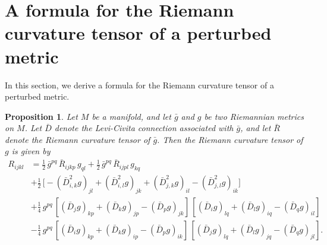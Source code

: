 \documentclass[11pt]{amsart}
\newtheorem{proposition}[theorem]{Proposition}
\theoremstyle{definition}
\begin{document}
\appendix

\section{A formula for the Riemann curvature tensor of a perturbed metric}

\label{curvature.of.perturbed.metric}

In this section, we derive a formula for the Riemann curvature tensor of a perturbed metric.

\begin{proposition}
\label{curvature.tensor.of.perturbed.metric}
Let $M$ be a manifold, and let $\bar{g}$ and $g$ be two Riemannian metrics on $M$. Let $\bar{D}$ denote the Levi-Civita connection associated with $\bar{g}$, and let $\bar{R}$ denote the Riemann curvature tensor of $\bar{g}$. Then the Riemann curvature tensor of $g$ is given by 
\begin{align*} 
R_{ijkl} 
&= \frac{1}{2} \, \bar{g}^{pq} \, \bar{R}_{ijkp} \, g_{ql} + \frac{1}{2} \, \bar{g}^{pq} \, \bar{R}_{ijpl} \, g_{kq} \\ 
&+ \frac{1}{2} \, \big [ -(\bar{D}_{i,k}^2 g)_{jl} + (\bar{D}_{i,l}^2 g)_{jk} + (\bar{D}_{j,k}^2 g)_{il} - (\bar{D}_{j,l}^2 g)_{ik} \big ] \\ 
&+ \frac{1}{4} \, g^{pq} \, [(\bar{D}_j g)_{kp} + (\bar{D}_k g)_{jp} - (\bar{D}_p g)_{jk}] \, [(\bar{D}_i g)_{lq} + (\bar{D}_l g)_{iq} - (\bar{D}_q g)_{il}] \\ 
&- \frac{1}{4} \, g^{pq} \, [(\bar{D}_i g)_{kp} + (\bar{D}_k g)_{ip} - (\bar{D}_p g)_{ik}] \, [(\bar{D}_j g)_{lq} + (\bar{D}_l g)_{jq} - (\bar{D}_q g)_{jl}]. 
\end{align*} 
\end{proposition}
\end{document}
